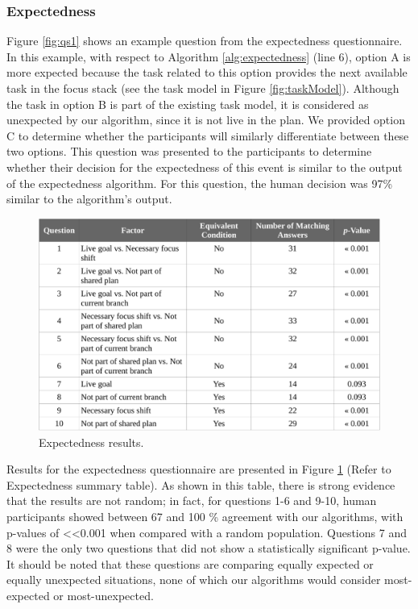 \documentclass[12pt]{report}
\begin{document}
\subsubsection{Expectedness}
\label{sec:expectedness-crowdsourcing}
Figure \ref{fig:qs1} shows an example question from the expectedness
questionnaire. In this example, with respect to Algorithm
\ref{alg:expectedness} (line 6), option A is more expected because the task
related to this option provides the next available task in the focus stack (see
the task model in Figure \ref{fig:taskModel}). Although the task in option B is
part of the existing task model, it is considered as unexpected by our
algorithm, since it is not live in the plan. We provided option C to determine
whether the participants will similarly differentiate between these two
options. This question was presented to the participants to determine whether
their decision for the expectedness of this event is similar to the output of
the expectedness algorithm. For this question, the human decision was 97\%
similar to the algorithm's output. 

\begin{figure}[tbh]
  \centering
  \includegraphics[width=1\textwidth]{figure/expectedness_result_croped.pdf}
  \caption{Expectedness results.}
  \label{fig:expectedness_result}
\end{figure}

Results for the expectedness questionnaire are presented in Figure
\ref{fig:expectedness_result} (Refer to Expectedness summary table). As shown in
this table, there is strong evidence that the results are not random; in fact,
for questions 1-6 and 9-10, human participants showed between 67 and 100 \%
agreement with our algorithms, with p-values of <<0.001 when compared with a
random population. Questions 7 and 8 were the only two questions that did not
show a statistically significant p-value. It should be noted that these
questions are comparing equally expected or equally unexpected situations, none
of which our algorithms would consider most-expected or most-unexpected. 
\end{document}
